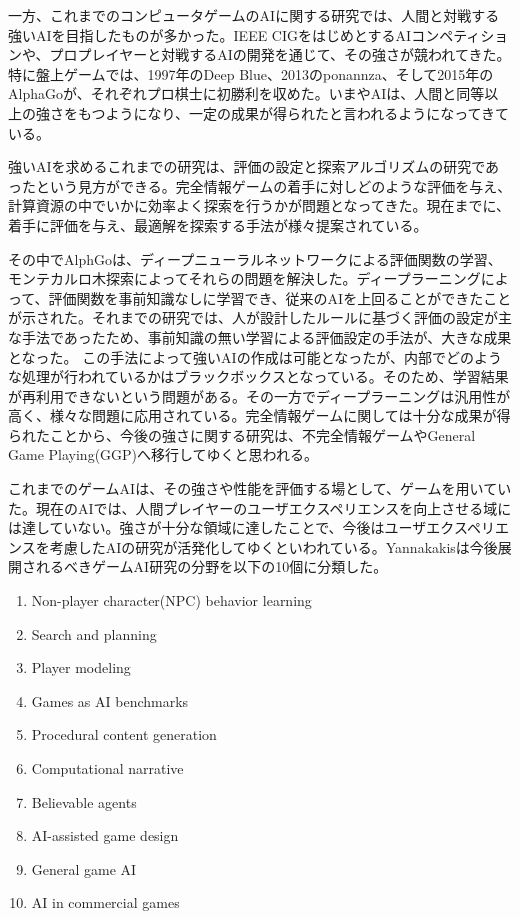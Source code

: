 \documentclass[12pt]{jreport}
\begin{document}

一方、これまでのコンピュータゲームのAIに関する研究では、人間と対戦する強いAIを目指したものが多かった。IEEE CIG\cite{cig}をはじめとするAIコンペティションや、プロプレイヤーと対戦するAIの開発を通じて、その強さが競われてきた。特に盤上ゲームでは、1997年のDeep Blue、2013のponannza、そして2015年のAlphaGo\cite{alphaGo}が、それぞれプロ棋士に初勝利を収めた。いまやAIは、人間と同等以上の強さをもつようになり、一定の成果が得られたと言われるようになってきている。

強いAIを求めるこれまでの研究は、評価の設定と探索アルゴリズムの研究であったという見方ができる。完全情報ゲームの着手に対しどのような評価を与え、計算資源の中でいかに効率よく探索を行うかが問題となってきた。現在までに、着手に評価を与え、最適解を探索する手法が様々提案されている。

その中でAlphGoは、ディープニューラルネットワークによる評価関数の学習、モンテカルロ木探索によってそれらの問題を解決した。ディープラーニングによって、評価関数を事前知識なしに学習でき、従来のAIを上回ることができたことが示された。それまでの研究では、人が設計したルールに基づく評価の設定が主な手法であったため、事前知識の無い学習による評価設定の手法が、大きな成果となった。
この手法によって強いAIの作成は可能となったが、内部でどのような処理が行われているかはブラックボックスとなっている。そのため、学習結果が再利用できないという問題がある。その一方でディープラーニングは汎用性が高く、様々な問題に応用されている\cite{NE, monte}。完全情報ゲームに関しては十分な成果が得られたことから、今後の強さに関する研究は、不完全情報ゲームやGeneral Game Playing(GGP)へ移行してゆくと思われる。

これまでのゲームAIは、その強さや性能を評価する場として、ゲームを用いていた。現在のAIでは、人間プレイヤーのユーザエクスペリエンスを向上させる域には達していない。強さが十分な領域に達したことで、今後はユーザエクスペリエンスを考慮したAIの研究が活発化してゆくといわれている\cite{miyake_genzai, ikeda}。Yannakakisは今後展開されるべきゲームAI研究の分野を以下の10個に分類した\cite{yan_panorama}。
\begin{enumerate}
\item Non-player character(NPC) behavior learning
\item Search and planning
\item Player modeling
\item Games as AI benchmarks
\item Procedural content generation
\item Computational narrative
\item Believable agents
\item AI-assisted game design
\item General game AI
\item AI in commercial games
\end{enumerate}
\end{document}
